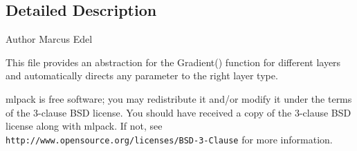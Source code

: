 \subsection{Detailed Description}
\begin{DoxyAuthor}{Author}
Marcus Edel
\end{DoxyAuthor}
This file provides an abstraction for the Gradient() function for different layers and automatically directs any parameter to the right layer type.

mlpack is free software; you may redistribute it and/or modify it under the terms of the 3-\/clause B\+SD license. You should have received a copy of the 3-\/clause B\+SD license along with mlpack. If not, see {\tt http\+://www.\+opensource.\+org/licenses/\+B\+S\+D-\/3-\/\+Clause} for more information. 